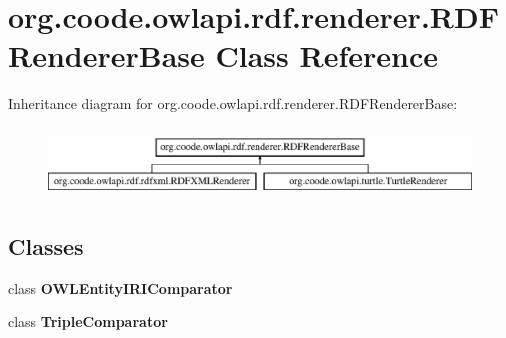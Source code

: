 \hypertarget{classorg_1_1coode_1_1owlapi_1_1rdf_1_1renderer_1_1_r_d_f_renderer_base}{\section{org.\-coode.\-owlapi.\-rdf.\-renderer.\-R\-D\-F\-Renderer\-Base Class Reference}
\label{classorg_1_1coode_1_1owlapi_1_1rdf_1_1renderer_1_1_r_d_f_renderer_base}
}
Inheritance diagram for org.\-coode.\-owlapi.\-rdf.\-renderer.\-R\-D\-F\-Renderer\-Base\-:\begin{figure}[H]
\begin{center}
\leavevmode
\includegraphics[height=1.854305cm]{classorg_1_1coode_1_1owlapi_1_1rdf_1_1renderer_1_1_r_d_f_renderer_base}
\end{center}
\end{figure}
\subsection*{Classes}
\begin{DoxyCompactItemize}
\item 
class {\bfseries O\-W\-L\-Entity\-I\-R\-I\-Comparator}
\item 
class {\bfseries Triple\-Comparator}
\end{DoxyCompactItemize}
